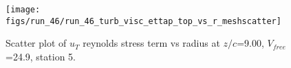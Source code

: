 \begin{figure}[H]
\centering
\texttt{[image: figs/run\_46/run\_46\_turb\_visc\_ettap\_top\_vs\_r\_meshscatter]}
\caption{Scatter plot of $
u_T$ reynolds stress term vs radius at $z/c$=9.00, $V_{free}$=24.9, station 5.}
\end{figure}


